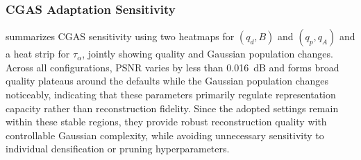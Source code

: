 \subsubsection{CGAS Adaptation Sensitivity}

 summarizes CGAS sensitivity using two heatmaps for
$(q_d,B)$ and $(q_p,q_A)$ and a heat strip for $\tau_\alpha$, jointly showing
quality and Gaussian population changes. Across all configurations, PSNR
varies by less than 0.016~dB and forms broad quality plateaus around the
defaults while the Gaussian population changes noticeably, indicating that
these parameters primarily regulate representation capacity rather than
reconstruction fidelity. Since the adopted settings remain within these stable
regions, they provide robust reconstruction quality with controllable Gaussian
complexity, while avoiding unnecessary sensitivity to individual
densification or pruning hyperparameters.
